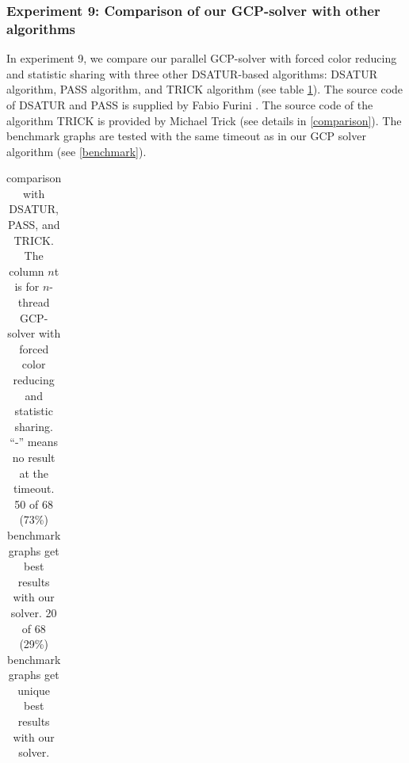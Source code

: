 \documentclass[12pt,a4paper,twoside]{scrartcl}
\numberwithin{equation}{section}
\begin{document}
\subsubsection{Experiment 9: Comparison of our GCP-solver with other algorithms}
\label{sec:Experiment 9} 
In experiment 9, we compare our parallel GCP-solver with forced color reducing and statistic sharing with three other DSATUR-based algorithms: DSATUR algorithm, PASS algorithm, and TRICK algorithm (see table \ref{Dsatur}). The source code of DSATUR and PASS is supplied by Fabio Furini \cite{Dalgorithm}. The source code of the algorithm TRICK is provided by Michael Trick \cite{Trickalgorithm} (see details in \ref{comparison}). The benchmark graphs are tested with the same timeout as in our GCP solver algorithm (see \ref{benchmark}).
\begin{table}[!htbp]
\caption{comparison with DSATUR, PASS, and TRICK. The column $n$t is for $n$-thread GCP-solver with forced color reducing and statistic sharing. ``-'' means no result at the timeout. 50 of 68 (73\%) benchmark graphs get best results with our solver. 20 of 68 (29\%) benchmark graphs get unique best results with our solver.}
\label{Dsatur}
\scriptsize

\begin{tabular}{|p{2.5cm} |p{1cm} p{1cm} p{1cm} p{1cm} p{1cm} p{1cm} p{1.8cm} p{1cm} p{1cm}|}
\hline





\end{tabular}
\end{table}
\end{document}
